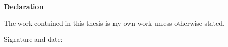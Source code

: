

\mbox{}\newline\vspace{10mm} \mbox{}\LARGE
%
{\bf Declaration} \normalsize \vspace{5mm}

The work contained in this thesis is my own work unless otherwise stated.

\bigskip
\bigskip
\bigskip


Signature and date: 





